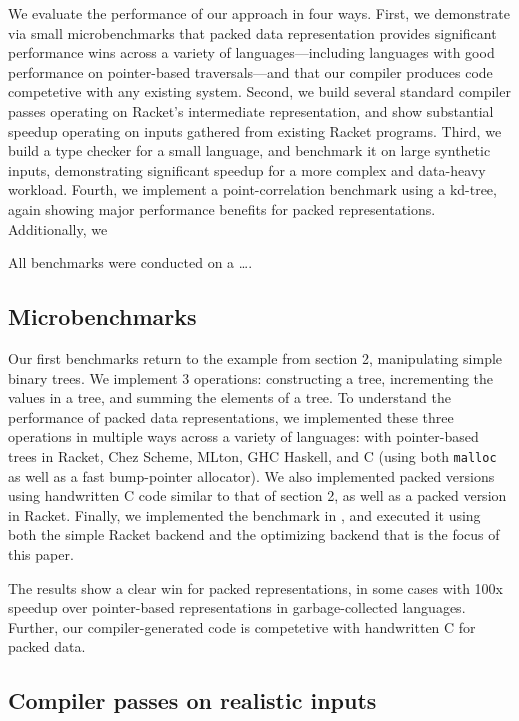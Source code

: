 \documentclass[preprint,10pt,nocopyrightspace,nonatbib]{./bibs/sigplanconf}
\begin{document}
We evaluate the performance of our approach in four ways. First, we
demonstrate via small microbenchmarks that packed data representation
provides significant performance wins across a variety of
languages---including languages with good performance on pointer-based
traversals---and that our compiler produces code competetive with any
existing system. Second, we build several standard compiler passes
operating on Racket's intermediate representation, and show
substantial speedup operating on inputs gathered from existing Racket
programs. Third, we build a type checker for a small language, and
benchmark it on large synthetic inputs, demonstrating significant
speedup for a more complex and data-heavy workload. Fourth, we
implement a point-correlation benchmark using a kd-tree, again showing
major performance benefits for packed representations. Additionally,
we 

All benchmarks were conducted on a \dots.

\subsection{Microbenchmarks}

Our first benchmarks return to the example from section 2,
manipulating simple binary trees. We implement 3 operations:
constructing a tree, incrementing the values in a tree, and summing
the elements of a tree. To understand the performance of packed data
representations, we implemented these three operations in multiple
ways across a variety of languages: with pointer-based trees in
Racket, Chez Scheme, MLton, GHC Haskell, and C (using both \texttt{malloc} as well
as a fast bump-pointer allocator). We also implemented packed versions
using handwritten C code similar to that of section 2, as well as a
packed version in Racket. Finally, we implemented the benchmark in
\treelang{}, and executed it using both the simple Racket backend and
the optimizing backend that is the focus of this paper.

The results show a clear win for packed representations, in some cases
with 100x speedup over pointer-based representations in
garbage-collected languages. Further, our compiler-generated code is
competetive with handwritten C for packed data.



\subsection{Compiler passes on realistic inputs}
\end{document}
